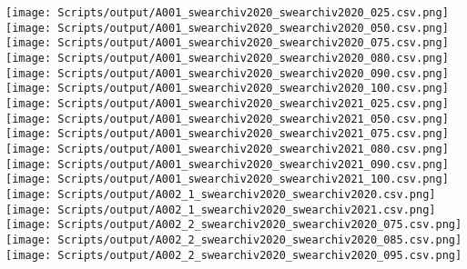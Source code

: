 \texttt{[image: Scripts/output/A001\_swearchiv2020\_swearchiv2020\_025.csv.png]}
\texttt{[image: Scripts/output/A001\_swearchiv2020\_swearchiv2020\_050.csv.png]}
\texttt{[image: Scripts/output/A001\_swearchiv2020\_swearchiv2020\_075.csv.png]}
\texttt{[image: Scripts/output/A001\_swearchiv2020\_swearchiv2020\_080.csv.png]}
\texttt{[image: Scripts/output/A001\_swearchiv2020\_swearchiv2020\_090.csv.png]}
\texttt{[image: Scripts/output/A001\_swearchiv2020\_swearchiv2020\_100.csv.png]}
\texttt{[image: Scripts/output/A001\_swearchiv2020\_swearchiv2021\_025.csv.png]}
\texttt{[image: Scripts/output/A001\_swearchiv2020\_swearchiv2021\_050.csv.png]}
\texttt{[image: Scripts/output/A001\_swearchiv2020\_swearchiv2021\_075.csv.png]}
\texttt{[image: Scripts/output/A001\_swearchiv2020\_swearchiv2021\_080.csv.png]}
\texttt{[image: Scripts/output/A001\_swearchiv2020\_swearchiv2021\_090.csv.png]}
\texttt{[image: Scripts/output/A001\_swearchiv2020\_swearchiv2021\_100.csv.png]}
\texttt{[image: Scripts/output/A002\_1\_swearchiv2020\_swearchiv2020.csv.png]}
\texttt{[image: Scripts/output/A002\_1\_swearchiv2020\_swearchiv2021.csv.png]}
\texttt{[image: Scripts/output/A002\_2\_swearchiv2020\_swearchiv2020\_075.csv.png]}
\texttt{[image: Scripts/output/A002\_2\_swearchiv2020\_swearchiv2020\_085.csv.png]}
\texttt{[image: Scripts/output/A002\_2\_swearchiv2020\_swearchiv2020\_095.csv.png]}
